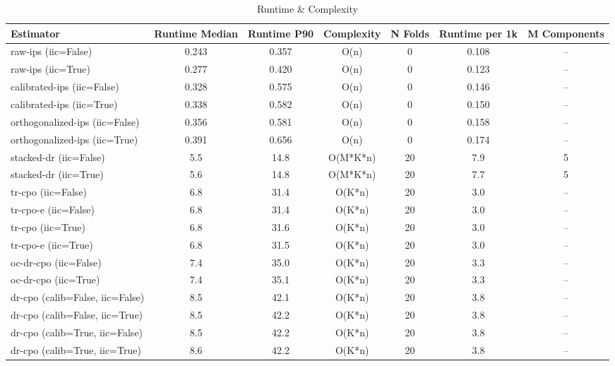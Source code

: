 \begin{table}[htbp]
\centering
\caption{Runtime & Complexity}
\label{tab:A6}
\begin{tabular}{l|cccccc}
\toprule
Estimator & Runtime Median & Runtime P90 & Complexity & N Folds & Runtime per 1k & M Components \\
\midrule
raw-ips (iic=False) & 0.243 & 0.357 & O(n) & 0 & 0.108 & -- \\
raw-ips (iic=True) & 0.277 & 0.420 & O(n) & 0 & 0.123 & -- \\
calibrated-ips (iic=False) & 0.328 & 0.575 & O(n) & 0 & 0.146 & -- \\
calibrated-ips (iic=True) & 0.338 & 0.582 & O(n) & 0 & 0.150 & -- \\
orthogonalized-ips (iic=False) & 0.356 & 0.581 & O(n) & 0 & 0.158 & -- \\
orthogonalized-ips (iic=True) & 0.391 & 0.656 & O(n) & 0 & 0.174 & -- \\
stacked-dr (iic=False) & 5.5 & 14.8 & O(M*K*n) & 20 & 7.9 & 5 \\
stacked-dr (iic=True) & 5.6 & 14.8 & O(M*K*n) & 20 & 7.7 & 5 \\
tr-cpo (iic=False) & 6.8 & 31.4 & O(K*n) & 20 & 3.0 & -- \\
tr-cpo-e (iic=False) & 6.8 & 31.4 & O(K*n) & 20 & 3.0 & -- \\
tr-cpo (iic=True) & 6.8 & 31.6 & O(K*n) & 20 & 3.0 & -- \\
tr-cpo-e (iic=True) & 6.8 & 31.5 & O(K*n) & 20 & 3.0 & -- \\
oc-dr-cpo (iic=False) & 7.4 & 35.0 & O(K*n) & 20 & 3.3 & -- \\
oc-dr-cpo (iic=True) & 7.4 & 35.1 & O(K*n) & 20 & 3.3 & -- \\
dr-cpo (calib=False, iic=False) & 8.5 & 42.1 & O(K*n) & 20 & 3.8 & -- \\
dr-cpo (calib=False, iic=True) & 8.5 & 42.2 & O(K*n) & 20 & 3.8 & -- \\
dr-cpo (calib=True, iic=False) & 8.5 & 42.2 & O(K*n) & 20 & 3.8 & -- \\
dr-cpo (calib=True, iic=True) & 8.6 & 42.2 & O(K*n) & 20 & 3.8 & -- \\
\bottomrule
\end{tabular}
\end{table}